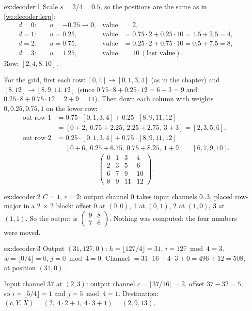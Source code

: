 
\begin{solution}{ex:decoder:1}
Scale $s = 2/4 = 0.5$, so the positions are the same as in \cref{we:decoder:lerp}:
\begin{align*}
d = 0:&\quad u = -0.25 \to 0, & \text{value} &= 2,\\
d = 1:&\quad u = 0.25, & \text{value} &= 0.75 \cdot 2 + 0.25 \cdot 10 = 1.5 + 2.5 = 4,\\
d = 2:&\quad u = 0.75, & \text{value} &= 0.25 \cdot 2 + 0.75 \cdot 10 = 0.5 + 7.5 = 8,\\
d = 3:&\quad u = 1.25, & \text{value} &= 10 \ (\text{last value}).
\end{align*}
Row: $[2, 4, 8, 10]$.

For the grid, first each row: $[0, 4] \to [0, 1, 3, 4]$ (as in the chapter) and $[8, 12] \to [8, 9, 11,
12]$ (since $0.75 \cdot 8 + 0.25 \cdot 12 = 6 + 3 = 9$ and $0.25 \cdot 8 + 0.75 \cdot 12 = 2 + 9 = 11$).
Then down each column with weights $0, 0.25, 0.75, 1$ on the lower row:
\begin{align*}
\text{out row 1} &= 0.75 \cdot [0,1,3,4] + 0.25 \cdot [8,9,11,12]\\
&= [0+2,\ 0.75+2.25,\ 2.25+2.75,\ 3+3] = [2, 3, 5, 6],\\
\text{out row 2} &= 0.25 \cdot [0,1,3,4] + 0.75 \cdot [8,9,11,12]\\
&= [0+6,\ 0.25+6.75,\ 0.75+8.25,\ 1+9] = [6, 7, 9, 10].
\end{align*}
\[
\begin{pmatrix} 0 & 1 & 3 & 4\\ 2 & 3 & 5 & 6\\ 6 & 7 & 9 & 10\\ 8 & 9 & 11 & 12 \end{pmatrix}.
\]
\end{solution}

\begin{solution}{ex:decoder:2}
$C = 1$, $r = 2$: output channel 0 takes input channels $0..3$, placed row-major in a 2 $\times$ 2 block:
offset 0 at $(0,0)$, 1 at $(0,1)$, 2 at $(1,0)$, 3 at $(1,1)$. So the output is
$\begin{pmatrix} 9 & 8\\ 7 & 6\end{pmatrix}$. Nothing was computed; the four numbers were moved.
\end{solution}

\begin{solution}{ex:decoder:3}
Output $(31, 127, 0)$: $h = \lfloor 127/4 \rfloor = 31$, $i = 127 \bmod 4 = 3$, $w = \lfloor 0/4 \rfloor = 0$,
$j = 0 \bmod 4 = 0$. Channel $= 31 \cdot 16 + 4 \cdot 3 + 0 = 496 + 12 = 508$, at position $(31, 0)$.

Input channel 37 at $(2, 3)$: output channel $c = \lfloor 37/16 \rfloor = 2$, offset $37 - 32 = 5$, so
$i = \lfloor 5/4 \rfloor = 1$ and $j = 5 \bmod 4 = 1$. Destination: $(c, Y, X) = (2,\ 4 \cdot 2 + 1,\ 4
\cdot 3 + 1) = (2, 9, 13)$.
\end{solution}

